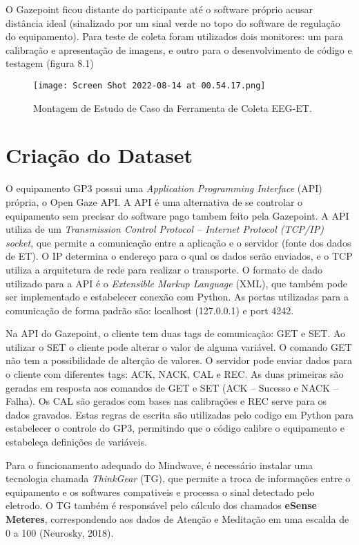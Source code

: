  
 
 O Gazepoint
  ficou distante do participante até o software próprio acusar distância ideal
   (sinalizado por um sinal verde no topo do software de regulação do equipamento). 
   Para teste de coleta foram utilizados dois monitores: um para calibração e apresentação de imagens, 
   e outro para o desenvolvimento de código e testagem (figura 8.1) 


\begin{figure}
    \centering
    \texttt{[image: Screen Shot 2022-08-14 at 00.54.17.png]}
    \caption{Montagem de Estudo de Caso da Ferramenta de Coleta EEG-ET.}
\end{figure}



\section{Criação do Dataset}
O equipamento GP3 possui uma \textit{Application Programming Interface} (API) própria, 
o Open Gaze API. 
A API é uma alternativa de se controlar o equipamento sem precisar do software 
pago tambem feito pela Gazepoint. A API utiliza de um \textit{Transmission Control Protocol – Internet Protocol (TCP/IP) 
socket}, que permite a comunicação entre a aplicação e o servidor (fonte dos dados de ET). 
O IP determina o endereço para o qual os dados serão enviados, e o TCP utiliza a arquitetura de 
rede para realizar o transporte. O formato de dado utilizado para a API é o \textit{Extensible Markup Language} (XML), 
que também pode ser implementado e estabelecer conexão com Python. 
As portas utilizadas para a comunicação de forma padrão são: 
localhost (127.0.0.1) e port 4242. 

Na API do Gazepoint, o cliente tem duas tags de comunicação: GET e SET. 
Ao utilizar o SET o cliente pode alterar o valor de alguma variável. 
O comando GET não tem a possibilidade de alterção de valores. O servidor 
pode enviar dados para o cliente com diferentes tags: ACK, NACK, CAL e REC. 
As duas primeiras são geradas em resposta aos comandos de GET e SET (ACK – Sucesso e NACK –Falha). 
Os CAL são gerados com bases nas calibrações e REC serve para os dados gravados. 
Estas regras de escrita são utilizadas pelo codigo em Python para estabelecer o controle do GP3,
 permitindo que o código calibre o equipamento e estabeleça definições de variáveis.

Para o funcionamento adequado do Mindwave, é necessário instalar uma tecnologia chamada \textit{ThinkGear} (TG), 
que permite a troca de informações entre o equipamento e os softwares compativeis e processa o 
sinal detectado pelo eletrodo. O TG também é responsável pelo cálculo dos chamados \textbf{eSense Meteres}, 
correspondendo aos dados de Atenção e Meditação em uma escalda de 0 a 100 (Neurosky, 2018). 

